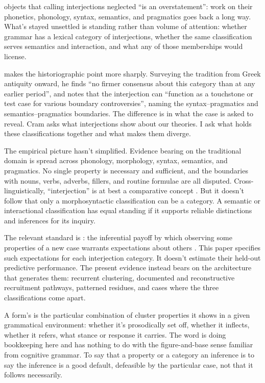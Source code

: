 \documentclass[12pt]{article}
\begin{document}
\textcite{libert2019} objects that calling interjections neglected
\enquote{is an overstatement}: work on their phonetics, phonology, syntax,
semantics, and pragmatics goes back a long way. What's stayed
unsettled is standing rather than volume of attention: whether grammar has a
lexical category of interjections, whether the same classification serves
semantics and interaction, and what any of those memberships would license.

\textcite[63]{cram2008} makes the historiographic point more sharply.
Surveying the tradition from Greek antiquity onward, he finds \enquote{no
firmer consensus about this category than at any earlier period}, and notes
that the interjection can \enquote{function as a touchstone or test case for various
boundary controversies}, naming the syntax--pragmatics and
semantics--pragmatics boundaries. The difference is in what the case is asked
to reveal.
Cram asks what interjections show about our theories. I ask what holds these
classifications together and what makes them diverge.

The empirical picture hasn't simplified. Evidence bearing on the traditional
domain is spread across phonology, morphology, syntax, semantics, and
pragmatics. No single property is necessary and sufficient, and the
boundaries with nouns, verbs, adverbs, fillers, and routine formulae are all
disputed. Cross-linguistically, \enquote{interjection} is at best a
comparative concept \citep{haspelmath2010}. But it doesn't follow that only a
morphosyntactic classification can be a category. A semantic or interactional
classification has equal standing if it supports reliable distinctions and
inferences for its inquiry.

The relevant standard is : the inferential payoff by
which observing some properties of a new case warrants expectations about
others \citep{Goodman1955}. This paper specifies such expectations for each
interjection category. It doesn't estimate their held-out predictive
performance. The present evidence instead bears on the architecture that
generates them: recurrent clustering, documented and reconstructive
recruitment pathways, patterned residues, and cases where the three
classifications come apart.

A form's  is the particular combination of cluster properties it shows
in a given grammatical environment: whether it's prosodically set off,
whether it inflects, whether it refers, what stance or response it carries.
The word is doing bookkeeping here and has nothing to do with the
figure-and-base sense familiar from cognitive grammar. To say that a
property or a category  an inference is to say the inference
is a good default, defeasible by the particular case, not that it follows
necessarily.
\end{document}
